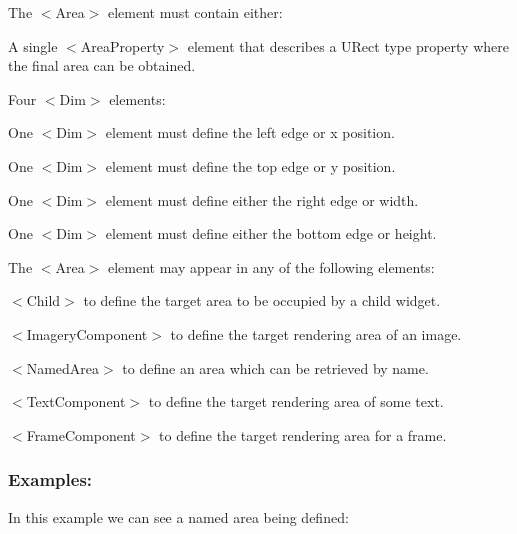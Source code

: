 \begin{DoxyItemize}
\item The {\ttfamily $<$Area$>$} element must contain either\+: 
\begin{DoxyItemize}
\item A single {\ttfamily $<$Area\+Property$>$} element that describes a U\+Rect type property where the final area can be obtained.


\item Four {\ttfamily $<$Dim$>$} elements\+: 
\begin{DoxyItemize}
\item One {\ttfamily $<$Dim$>$} element must define the left edge or x position. 
\item One {\ttfamily $<$Dim$>$} element must define the top edge or y position. 
\item One {\ttfamily $<$Dim$>$} element must define either the right edge or width. 
\item One {\ttfamily $<$Dim$>$} element must define either the bottom edge or height. 
\end{DoxyItemize}
\end{DoxyItemize}


\item The {\ttfamily $<$Area$>$} element may appear in any of the following elements\+: 
\begin{DoxyItemize}
\item {\ttfamily $<$Child$>$} to define the target area to be occupied by a child widget. 
\item {\ttfamily $<$Imagery\+Component$>$} to define the target rendering area of an image. 
\item {\ttfamily $<$Named\+Area$>$} to define an area which can be retrieved by name. 
\item {\ttfamily $<$Text\+Component$>$} to define the target rendering area of some text. 
\item {\ttfamily $<$Frame\+Component$>$} to define the target rendering area for a frame. 
\end{DoxyItemize}
\end{DoxyItemize}\hypertarget{fal_element_ref_fal_elem_ref_sec_3_4}{}\subsubsection{Examples\+:}\label{fal_element_ref_fal_elem_ref_sec_3_4}
In this example we can see a named area being defined\+: 
\begin{DoxyCode}{0}
\end{DoxyCode}
